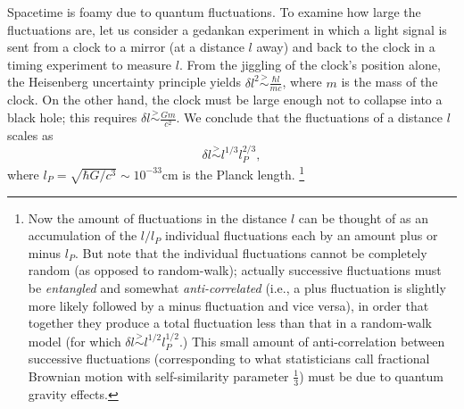 \documentclass[a4paper]{jpconf}
\begin{document}
Spacetime is foamy due to quantum fluctuations.
To examine how
large the fluctuations are, let us consider a gedankan experiment
in which a light signal is sent from a clock to a mirror (at a
distance $l$ away) and back to the clock in a timing experiment to
measure  $l$.  From the jiggling of the clock's position alone, the Heisenberg
uncertainty principle yields $\delta l^2 \stackrel{>}{\sim}
\frac{\hbar l}{mc}$, where $m$ is the mass of the clock. On the
other hand, the clock must be large enough not to collapse into a
black hole; this requires $\delta l \stackrel{>}{\sim} \frac{Gm}{c^2}$.  We
conclude that the fluctuations of a distance $l$ scales as
\begin{equation}
\delta l \stackrel{>}{\sim} l^{1/3} l_P^{2/3}, 
\label{deltal}
\end{equation}
where $l_P  = \sqrt{\hbar G/ c^3} \sim 10^{-33}$cm is
the Planck length. \footnote{Now
the amount of fluctuations in the distance
$l$ can be thought of as an accumulation of the
$l/l_P$ individual fluctuations each by an amount plus or minus $l_P$.
But note that the individual fluctuations cannot be completely
random (as opposed to random-walk); actually
successive fluctuations must be {\it entangled} and somewhat
{\it anti-correlated}
(i.e., a plus fluctuation is slightly more likely followed by a minus
fluctuation and vice versa),
in order that together they produce a total fluctuation less
than that in a random-walk model (for which 
$\delta l \stackrel{>}{\sim} l^{1/2} l_P^{1/2}$.) \cite{yjng05}
This small amount of
anti-correlation between successive fluctuations (corresponding to
what statisticians call fractional Brownian motion with
self-similarity parameter $\frac{1}{3}$)
must be due to quantum gravity effects.}
\cite{ng94,ng95,Karol}\\
\end{document}
